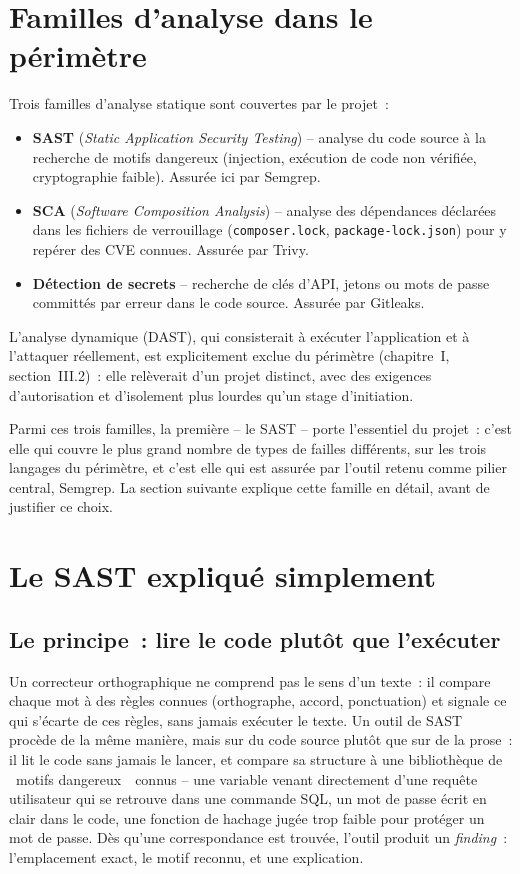 \documentclass[12pt,a4paper,oneside]{report}
\begin{document}
\section{Familles d'analyse dans le p\'erim\`etre}
Trois familles d'analyse statique sont couvertes par le projet~:
\begin{itemize}
\item \textbf{SAST} (\emph{Static Application Security Testing}) -- analyse du code source \`a la recherche de motifs dangereux (injection, ex\'ecution de code non v\'erifi\'ee, cryptographie faible). Assur\'ee ici par Semgrep.
\item \textbf{SCA} (\emph{Software Composition Analysis}) -- analyse des d\'ependances d\'eclar\'ees dans les fichiers de verrouillage (\texttt{composer.lock}, \texttt{package-lock.json}) pour y rep\'erer des CVE connues. Assur\'ee par Trivy.
\item \textbf{D\'etection de secrets} -- recherche de cl\'es d'API, jetons ou mots de passe committ\'es par erreur dans le code source. Assur\'ee par Gitleaks.
\end{itemize}
L'analyse dynamique (DAST), qui consisterait \`a ex\'ecuter l'application et \`a l'attaquer r\'eellement, est explicitement exclue du p\'erim\`etre (chapitre~I, section~III.2)~: elle rel\`everait d'un projet distinct, avec des exigences d'autorisation et d'isolement plus lourdes qu'un stage d'initiation.

Parmi ces trois familles, la premi\`ere -- le SAST -- porte l'essentiel du projet~: c'est elle qui couvre le plus grand nombre de types de failles diff\'erents, sur les trois langages du p\'erim\`etre, et c'est elle qui est assur\'ee par l'outil retenu comme pilier central, Semgrep. La section suivante explique cette famille en d\'etail, avant de justifier ce choix.

\section{Le SAST expliqu\'e simplement}

\subsection{Le principe~: lire le code plut\^ot que l'ex\'ecuter}
Un correcteur orthographique ne comprend pas le sens d'un texte~: il compare chaque mot \`a des r\`egles connues (orthographe, accord, ponctuation) et signale ce qui s'\'ecarte de ces r\`egles, sans jamais ex\'ecuter le texte. Un outil de SAST proc\`ede de la m\^eme mani\`ere, mais sur du code source plut\^ot que sur de la prose~: il lit le code sans jamais le lancer, et compare sa structure \`a une biblioth\`eque de \guillemotleft~motifs dangereux~\guillemotright\ connus -- une variable venant directement d'une requ\^ete utilisateur qui se retrouve dans une commande SQL, un mot de passe \'ecrit en clair dans le code, une fonction de hachage jug\'ee trop faible pour prot\'eger un mot de passe. D\`es qu'une correspondance est trouv\'ee, l'outil produit un \emph{finding}~: l'emplacement exact, le motif reconnu, et une explication.
\end{document}
